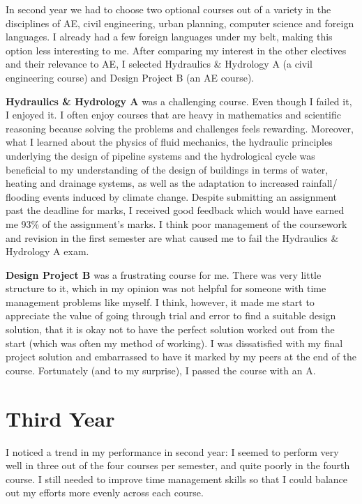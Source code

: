 
In second year we had to choose two optional courses out of a variety in the disciplines of AE, civil engineering, urban planning, computer science and foreign languages.
I already had a few foreign languages under my belt, making this option less interesting to me.
After comparing my interest in the other electives and their relevance to AE, I selected Hydraulics \& Hydrology A (a civil engineering course) and Design Project B (an AE course).

\textbf{Hydraulics \& Hydrology A} was a challenging course.
Even though I failed it, I enjoyed it.
I often enjoy courses that are heavy in mathematics and scientific reasoning because solving the problems and challenges feels rewarding.
Moreover, what I learned about the physics of fluid mechanics, the hydraulic principles underlying the design of pipeline systems and the hydrological cycle was beneficial to my understanding of the design of buildings in terms of water, heating and drainage systems, as well as the adaptation to increased rainfall/ flooding events induced by climate change.
Despite submitting an assignment past the deadline for marks, I received good feedback which would have earned me 93\% of the assignment's marks.
I think poor management of the coursework and revision in the first semester are what caused me to fail the Hydraulics \& Hydrology A exam.

\textbf{Design Project B} was a frustrating course for me.
There was very little structure to it, which in my opinion was not helpful for someone with time management problems like myself.
I think, however, it made me start to appreciate the value of going through trial and error to find a suitable design solution, that it is okay not to have the perfect solution worked out from the start (which was often my method of working).
I was dissatisfied with my final project solution and embarrassed to have it marked by my peers at the end of the course.
Fortunately (and to my surprise), I passed the course with an A.



\section{Third Year}

I noticed a trend in my performance in second year: I seemed to perform very well in three out of the four courses per semester, and quite poorly in the fourth course.
I still needed to improve time management skills so that I could balance out my efforts more evenly across each course.


